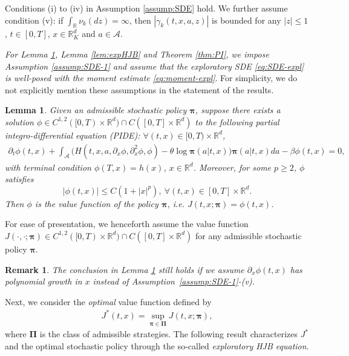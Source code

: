 \documentclass[11pt]{article}
\newtheorem{lemma}{Lemma}
\newtheorem{remark}{Remark}
\newenvironment{assumptionp}[1]{
	\renewcommand\theassumptionalt{#1}
	\assumptionalt
}{\endassumptionalt}
\newcommand{\1}{\mathbbm{1}}
\newcommand{\bpi}{\boldsymbol{\pi}}
\newcommand{\bPi}{\boldsymbol{\Pi}}
\begin{document}
\begin{assumptionp}{\ref*{assump:SDE}$'$}\label{assump:SDE-1}
	Conditions (i) to (iv) in Assumption \ref{assump:SDE} hold. We further assume condition (v): if $\int_{\mathbb{R}}\nu_k(dz)=\infty$, then $|\gamma_k(t,x,a,z)|$ is bounded for any $|z|\leq 1$, $t\in[0,T]$, $x\in\mathbb{R}_K^d$ and $a\in\mathcal{A}$.
\end{assumptionp}

\textit{For Lemma \ref{lem:PK}, Lemma \ref{lem:expHJB} and Theorem \ref{thm:PI}, we impose Assumption \ref{assump:SDE-1} and assume that the exploratory SDE \eqref{eq:SDE-expl} is well-posed with the moment estimate \eqref{eq:moment-expl}}. For simplicity, we do not explicitly mention these assumptions in the statement of the results.

\begin{lemma}\label{lem:PK}
		Given an admissible stochastic policy $\bpi$, suppose there exists a solution $ \phi\in C^{1,2}([0,T)\times\mathbb{R}^d)\cap C([0,T]\times\mathbb{R}^d)$ to the following partial integro-differential equation (PIDE): $\forall (t,x) \in [0, T)\times\mathbb{R}^d$,
	\begin{align}
		\partial_t \phi(t,x) +   \int_{\mathcal{A}} \big(H(t,x, a, \partial_x\phi, \partial_x^2\phi, \phi) - \theta \log \bpi(a | t, x)\big) \bpi(a | t, x) da  - \beta \phi(t, x) = 0, \label{eq:FK}
	\end{align}
	with terminal condition $\phi(T, x) = h (x)$, $x\in \mathbb{R}^d$. Moreover, for some $p\geq 2$, $\phi$ satisfies
	\begin{equation}
		|\phi(t, x)|\leq C(1+|x|^p),\ \forall (t,x)\in[0,T]\times\mathbb{R}^d.\label{eq:VF-PolyG}
	\end{equation}
	Then $\phi$ is the value function of the policy $\boldsymbol{\pi}$, i.e. $J(t, x; \boldsymbol{\pi})=\phi(t,x)$.
\end{lemma}

For ease of  presentation, we henceforth assume the value function $J(\cdot, \cdot; \bpi) \in C^{1,2}([0,T)\times\mathbb{R}^d)\cap C([0,T]\times\mathbb{R}^d)$ for any admissible stochastic policy $\bpi$.

\begin{remark}
The conclusion in Lemma \ref{lem:PK} still holds if we assume $\partial_x\phi(t,x)$ has polynomial growth in $x$ instead of Assumption~\ref{assump:SDE-1}-(v).
\end{remark}

Next, we consider the {\it optimal} value function defined by
\begin{align} \label{eq:Jstar}
J^*(t, x) = \sup_{\bpi\in\bPi} J(t, x; \bpi),
\end{align}
where $\bPi$ is the class of admissible strategies. The following result characterizes $J^*$ and the optimal stochastic policy through the so-called {\it exploratory HJB equation}.
\end{document}

